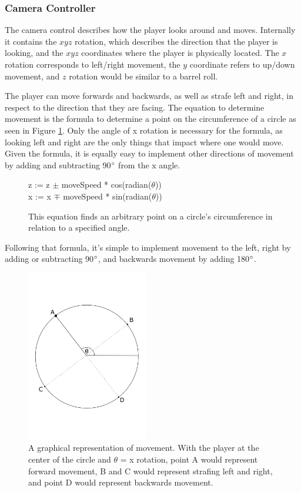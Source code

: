 \documentclass{article}
\begin{document}
\subsubsection{Camera Controller} \label{subsubsec:camera}

The camera control describes how the player looks around and moves. Internally it contains the $xyz$ rotation, which describes the direction that the player is looking, and the $xyz$ coordinates where the player is physically located. The $x$ rotation corresponds to left/right movement, the $y$ coordinate refers to up/down movement, and $z$ rotation would be similar to a barrel roll.

The player can move forwards and backwards, as well as strafe left and right, in respect to the direction that they are facing. The equation to determine movement is the formula to determine a point on the circumference of a circle as seen in Figure \ref{fig:circumference}. Only the angle of x rotation is necessary for the formula, as looking left and right are the only things that impact where one would move. Given the formula, it is equally easy to implement other directions of movement by adding and subtracting 90$\degree$ from the x angle.

\begin{figure}[H]
\centering
z := z $\pm$ moveSpeed * cos(radian($\theta$)) \\ 
x := x $\mp$ moveSpeed * sin(radian($\theta$))

\caption{This equation finds an arbitrary point on a circle's circumference in relation to a specified angle. \cite{bib:Deyoso} }
\label{fig:circumference}
\end{figure}
Following that formula, it's simple to implement movement to the left, right by adding or subtracting 90$\degree$, and backwards movement by adding 180$\degree$.

\begin{figure}[H]
\centering
\includegraphics[width=200px]{circle}
\caption{A graphical representation of movement. With the player at the center of the circle and $\theta$ = x rotation, point A would represent forward movement, B and C would represent strafing left and right, and point D would represent backwards movement.}
\label{fig:circle}
\end{figure}
\end{document}
